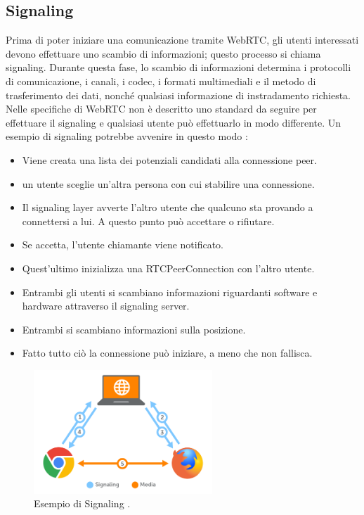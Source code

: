 \documentclass[11pt, a4paper, openany]{book}
\begin{document}
  	\subsection{Signaling}
 	Prima di poter iniziare una comunicazione tramite WebRTC, gli utenti interessati devono effettuare uno scambio di informazioni; questo processo si chiama signaling. Durante questa fase, lo scambio di informazioni determina i protocolli di comunicazione, i canali, i codec, i formati multimediali e il metodo di trasferimento dei dati, nonché qualsiasi informazione di instradamento richiesta. Nelle specifiche di WebRTC non è descritto uno standard da seguire per effettuare il signaling e qualsiasi utente può effettuarlo in modo differente. Un esempio di signaling potrebbe avvenire in questo modo \cite{12}:
 	\begin{itemize}
 		\item Viene creata una lista dei potenziali candidati alla connessione peer.
 		\item un utente sceglie un'altra persona con cui stabilire una connessione. 
 		\item Il signaling layer avverte l'altro utente che qualcuno sta provando a connettersi a lui. A questo punto può accettare o rifiutare.
 		\item Se accetta, l'utente chiamante viene notificato.
 		\item Quest'ultimo inizializza una RTCPeerConnection con l'altro utente.
 		\item Entrambi gli utenti si scambiano informazioni riguardanti software e hardware attraverso il signaling server.
 		\item Entrambi si scambiano informazioni sulla posizione.
 		\item Fatto tutto ciò la connessione può iniziare, a meno che non fallisca.
 	\end{itemize}
 	\begin{figure}[h!]
 		\centering
 		\includegraphics[width=0.6\textwidth]{img/Signaling.png}
 		\caption{Esempio di Signaling \cite{65}.}
 	\end{figure}
 	\newpage
\end{document}
